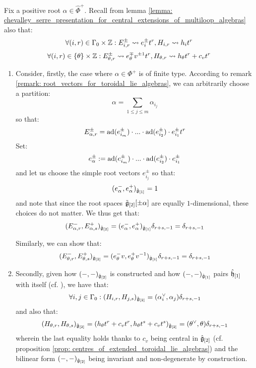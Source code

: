         \begin{remark} \label{remark: pairing_positive_and_negative_root_spaces_in_toroidal_lie_algebras}
            Fix a positive root $\alpha \in \hat{\Phi}^+$. Recall from lemma \ref{lemma: chevalley_serre_presentation_for_central_extensions_of_multiloop_algebras} also that:
                $$\forall (i, r) \in \Gamma_0 \x \Z: E_{i, r}^{\pm} \mapsto e_i^{\pm} t^r, H_{i, r} \mapsto h_i t^r$$
                $$\forall (i, r) \in \{\theta\} \x \Z: E_{\theta, r}^{\pm} \mapsto e_{\theta}^{\mp} v^{\pm 1} t^r, H_{\theta, r} \mapsto h_{\theta} t^r + c_v t^r$$
            \begin{enumerate}
                \item Consider, firstly, the case where $\alpha \in \Phi^+$ is of finite type. According to remark \ref{remark: root_vectors_for_toroidal_lie_algebras}, we can arbitrarily choose a partition:
                    $$\alpha = \sum_{1 \leq j \leq m} \alpha_{i_j}$$
                so that:
                    $$E_{\alpha, r}^{\pm} = \mathrm{ad}(e_{i_m}^{\pm}) \cdot ... \cdot \mathrm{ad}(e_{i_2}^{\pm}) \cdot e_{i_1}^{\pm} t^r$$
                Set:
                    $$e_{\alpha}^{\pm} := \mathrm{ad}(e_{i_m}^{\pm}) \cdot ... \cdot \mathrm{ad}(e_{i_2}^{\pm}) \cdot e_{i_1}^{\pm}$$
                and let us choose the simple root vectors $e_{i_j}^{\pm}$ so that:
                    $$(e_{\alpha}^-, e_{\alpha}^+)_{\hat{\mathfrak{g}}_{[1]}} = 1$$
                and note that since the root spaces $\tilde{\mathfrak{g}}_{[2]}[\pm\alpha]$ are equally $1$-dimensional, these choices do not matter. We thus get that:
                    $$(E_{\alpha, r}^-, E_{\alpha, s}^+)_{\hat{\mathfrak{g}}_{[2]}} = (e_{\alpha}^-, e_{\alpha}^+)_{\hat{\mathfrak{g}}_{[1]}} \delta_{r + s, -1} = \delta_{r + s, -1}$$

                Similarly, we can show that:
                    $$(E_{\theta, r}^-, E_{\theta, s}^+)_{\hat{\mathfrak{g}}_{[2]}} = (e_{\theta}^- v, e_{\theta}^+ v^{-1})_{\hat{\mathfrak{g}}_{[1]}} \delta_{r + s, -1} = \delta_{r + s, -1}$$
                \item Secondly, given how $(-, -)_{\hat{\mathfrak{g}}_{[2]}}$ is constructed and how $(-, -)_{\hat{\mathfrak{g}}_{[1]}}$ pairs $\hat{\mathfrak{h}}_{[1]}$ with itself (cf. \cite[Chapter 2]{kac_infinite_dimensional_lie_algebras}), we have that:
                    $$\forall i,j \in \Gamma_0: (H_{i, r}, H_{j, s})_{\hat{\mathfrak{g}}_{[2]}} = (\alpha_i^{\vee}, \alpha_j) \delta_{r + s, -1}$$
                and also that:
                    $$(H_{\theta, r}, H_{\theta, s})_{\hat{\mathfrak{g}}_{[2]}} = (h_{\theta} t^r + c_v t^r, h_{\theta} t^s + c_v t^s)_{\hat{\mathfrak{g}}_{[2]}} = (\theta^{\vee}, \theta) \delta_{r + s, -1}$$
                wherein the last equality holds thanks to $c_v$ being central in $\hat{\mathfrak{g}}_{[2]}$ (cf. proposition \ref{prop: centres_of_extended_toroidal_lie_algebras}) and the bilinear form $(-, -)_{\hat{\mathfrak{g}}_{[2]}}$ being invariant and non-degenerate by construction. 


\end{enumerate}
\end{remark}
